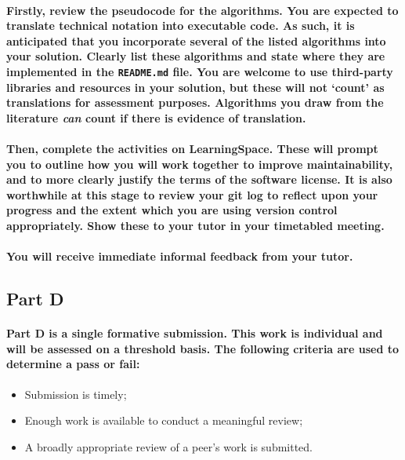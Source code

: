 \documentclass{../../fal_assignment}
\begin{document}
\paragraph{Firstly, review the pseudocode for the algorithms. You are expected to translate technical notation into executable code. As such, it is anticipated that you incorporate several of the listed algorithms into your solution. Clearly list these algorithms and state where they are implemented in the \texttt{README.md} file. You are welcome to use third-party libraries and resources in your solution, but these will not `count' as translations for assessment purposes. Algorithms you draw from the literature \textit{can} count if there is evidence of translation.}

\paragraph{Then, complete the activities on LearningSpace. These will prompt you to outline how you will work together to improve maintainability, and to more clearly justify the terms of the software license. It is also worthwhile at this stage to review your git log to reflect upon your progress and the extent which you are using version control appropriately. Show these to your tutor in your timetabled meeting.}

\paragraph{You will receive immediate \textbf{informal feedback} from your \textbf{tutor}.}

\subsection*{Part D}

\paragraph{Part D is a \textbf{single formative submission}. This work is \textbf{individual} and will be assessed on a \textbf{threshold} basis. The following criteria are used to determine a pass or fail:}

\begin{itemize}
	\item Submission is timely;
	\item Enough work is available to conduct a meaningful review;
	\item A broadly appropriate review of a peer's work is submitted.
\end{itemize}
\end{document}
